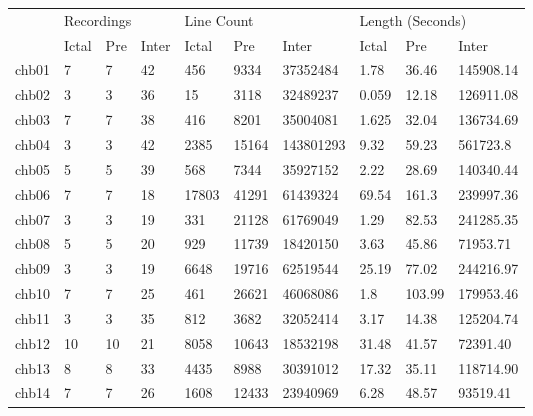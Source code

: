 \documentclass[12pt]{article}
\begin{document}
\begin{table}[H]
\centering
\begin{center}
\begin{tabular}{l|lll|lll|lll}
      & \multicolumn{3}{l|}{Recordings} & \multicolumn{3}{l|}{Line Count} & \multicolumn{3}{l}{Length (Seconds)} \\
      & Ictal     & Pre     & Inter     & Ictal   & Pre     & Inter       & Ictal     & Pre       & Inter        \\ \hline
chb01 & 7         & 7       & 42        & 456     & 9334    & 37352484    & 1.78      & 36.46     & 145908.14    \\
chb02 & 3         & 3       & 36        & 15      & 3118    & 32489237    & 0.059     & 12.18     & 126911.08    \\
chb03 & 7         & 7       & 38        & 416     & 8201    & 35004081    & 1.625     & 32.04     & 136734.69    \\
chb04 & 3         & 3       & 42        & 2385    & 15164   & 143801293   & 9.32      & 59.23     & 561723.8     \\
chb05 & 5         & 5       & 39        & 568     & 7344    & 35927152    & 2.22      & 28.69     & 140340.44    \\
chb06 & 7         & 7       & 18        & 17803   & 41291   & 61439324    & 69.54     & 161.3     & 239997.36    \\
chb07 & 3         & 3       & 19        & 331     & 21128   & 61769049    & 1.29      & 82.53     & 241285.35    \\
chb08 & 5         & 5       & 20        & 929     & 11739   & 18420150    & 3.63      & 45.86     & 71953.71     \\
chb09 & 3         & 3       & 19        & 6648    & 19716   & 62519544    & 25.19     & 77.02     & 244216.97    \\
chb10 & 7         & 7       & 25        & 461     & 26621   & 46068086    & 1.8       & 103.99    & 179953.46    \\
chb11 & 3         & 3       & 35        & 812     & 3682    & 32052414    & 3.17      & 14.38     & 125204.74    \\
chb12 & 10        & 10      & 21        & 8058    & 10643   & 18532198    & 31.48     & 41.57     & 72391.40     \\
chb13 & 8         & 8       & 33        & 4435    & 8988    & 30391012    & 17.32     & 35.11     & 118714.90    \\
chb14 & 7         & 7       & 26        & 1608    & 12433   & 23940969    & 6.28      & 48.57     & 93519.41     \\

\end{tabular}
\end{center}
\end{table}
\end{document}
